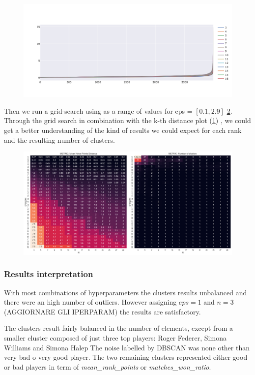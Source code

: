 \begin{figure}[h]
\centering
\includegraphics[width=\textwidth]{plots/dbscan/dbscan_distances}
\label{fig:dbscan_distances}
\end{figure}

Then we run a grid-search using as a range of values for eps = $[0.1, 2.9]$ \ref{fig:dbscan_metrics}. Through the grid search in combination with the k-th distance plot (\ref{fig:dbscan_distances}) , we could get a better understanding of the kind of results we could expect for each rank and the resulting number of clusters.

\begin{figure}[h]
\centering
\includegraphics[width=.6\textwidth]{plots/dbscan/dbscan_metrics}
\label{fig:dbscan_metrics}
\end{figure}

\subsubsection{Results interpretation}
With most combinations of hyperparameters the clusters results unbalanced and there were an high number of outliers.
However assigning $eps=1$ and $n=3$ (AGGIORNARE GLI IPERPARAM) the results are satisfactory.

The clusters result fairly balanced in the number of elements, except from a smaller cluster composed of just three top players: Roger Federer, Simona Williams and Simona Halep
The noise labelled by DBSCAN was none other than very bad o very good player.
The two remaining clusters represented either good or bad players in term of \textit{mean\_rank\_points} or \textit{matches\_won\_ratio}.

